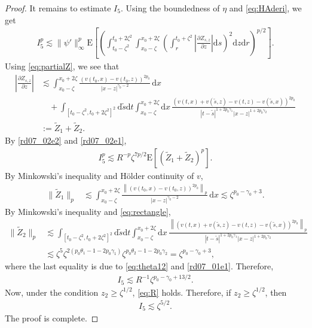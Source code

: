 \documentclass[12pt,a4paper]{article}
\newcommand{\E}{\mathrm{E}}
\renewcommand{\d}{\mathrm{d}}
\newcommand {\deltah}{{\zeta}}
\newcommand{\<}{\langle}
\renewcommand{\>}{\rangle}
\begin{document}
\begin{proof}
           It remains to estimate $I_5$. Using the boundedness of $\eta$ and \eqref{eq:HAderi}, we get
 \begin{align}\label{rd07_02e2}
           I_5^p\lesssim \|\psi'\|^p_{\infty}\E\left[\left(\int_{t_0-\deltah^2}^{t_0+2\deltah^2}\int_{x_0-\deltah}^{x_0+2\deltah} \left(\int_r^{t_0+\deltah^2}\left|\frac{\partial Z_{s,z}}{\partial z}\right|\d s\right)^2\d z \d r\right)^{p/2}\right].
\end{align}
 Using \eqref{eq:partialZ}, we see that
\begin{align}
           \left| \frac{\partial Z_{s,z}}{\partial z} \right| &\lesssim \int_{x_0-\deltah}^{x_0+2\deltah} \frac {(v(t_0,x)-v(t_0,z))^{2p_0}}{|x-z|^{\gamma_0-2} }\, \d x\nonumber\\
           &\quad +
            \int_{[t_0-\deltah^2, t_0+2\deltah^2]^2}\d \tilde{s}\d t \int_{x_0-\deltah}^{x_0+2\deltah} \d x\, \frac {(v(t,x)+v(\tilde{s},z)-v(t,z)-v(\tilde{s},x))^{2p_0}}{|t-\tilde{s}|^{1+2p_0\gamma_1}|x-z|^{1+2p_0\gamma_2}}\nonumber\\
            &:=\tilde{Z}_1 +\tilde{Z}_2. 
 \label{z1z2}
\end{align}
By \eqref{rd07_02e2} and \eqref{rd07_02e1}, 
           \begin{align*}
           I_5^p \lesssim R^{-p}\deltah^{7p/2}\E\left[(\tilde{Z}_1+\tilde{Z}_2)^p\right].
           \end{align*}
           By Minkowski's inequality and H\"older continuity of $v$,
           \begin{align}
           \|\tilde{Z}_1\|_p &\lesssim   \int_{x_0-\deltah}^{x_0+2\deltah} \frac {\left\|(v(t_0,x)-v(t_0,z))^{2p_0}\right\|_{p}}{|x-z|^{\gamma_0-2} }\, \d x
           \lesssim \deltah^{p_0-\gamma_0+3}. \label{eq:z1}
           \end{align} 
           By Minkowski's inequality and \eqref{eq:rectangle},
           \begin{align}
           \|\tilde{Z}_2\|_{p} &\lesssim    \int_{[t_0-\deltah^2, t_0+2\deltah^2]^2}\d \tilde{s}\d t \int_{x_0-\deltah}^{x_0+2\deltah} \d x\, 
               \frac {\left\|(v(t,x)+v(\tilde{s},z)-v(t,z)-v(\tilde{s},x))^{2p_0}\right\|_{p}}{|t-\tilde{s}|^{1+2p_0\gamma_1}|x-z|^{1+2p_0\gamma_2}}\nonumber\\
           &\lesssim \deltah^{5}\deltah^{2(p_0\theta_1-1-2p_0\gamma_1)}\deltah^{p_0\theta_2-1-2p_0\gamma_2}
           =\deltah^{p_0-\gamma_0+3}, \label{eq:z2}
           \end{align}
           where the last equality is due to \eqref{eq:theta12} and \eqref{rd07_01e1}.
           Therefore, 
           \begin{align*}
           I_5\lesssim R^{-1}\deltah^{p_0-\gamma_0+13/2}.
           \end{align*}
           Now, under the condition $z_2\geq \deltah^{1/2}$, \eqref{eq:R} holds. Therefore, 
           if $z_2\geq \deltah^{1/2}$, then 
           \begin{align}\label{rd08_06e1}
           I_5\lesssim \deltah^{5/2}.
           \end{align}
           The proof is complete.
\end{proof}
 
\end{document}
